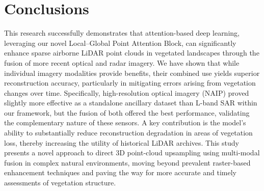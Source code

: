 \documentclass[remotesensing,article,accept,pdftex,moreauthors]{Definitions/mdpi}
\begin{document}
\section{Conclusions}

This research successfully demonstrates that attention-based deep learning, leveraging our novel Local--Global Point Attention Block, can significantly enhance sparse airborne LiDAR point clouds in vegetated landscapes through the fusion of more recent optical and radar imagery. We have shown that while individual imagery modalities provide benefits, their combined use yields superior reconstruction accuracy, particularly in mitigating errors arising from vegetation changes over time. Specifically, high-resolution optical imagery (NAIP) proved slightly more effective as a standalone ancillary dataset than L-band SAR within our framework, but the fusion of both offered the best performance, validating the complementary nature of these sensors. A key contribution is the model's ability to substantially reduce reconstruction degradation in areas of vegetation loss, thereby increasing the utility of historical LiDAR archives. This study presents a novel approach to direct 3D point-cloud upsampling using multi-modal fusion in complex natural environments, moving beyond prevalent raster-based enhancement techniques and paving the way for more accurate and timely assessments of vegetation structure.


\vspace{6pt}


\end{document}
